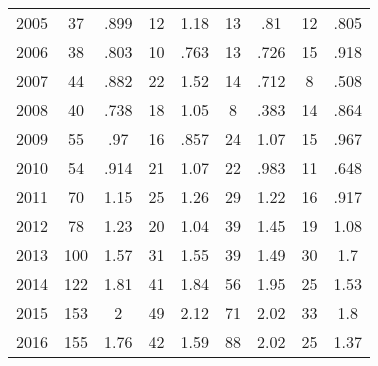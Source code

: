 \begin{table}[htbp]
\begin{tabular}{l*{8}{c}}
2005      &       37&     .899&       12&     1.18&       13&      .81&       12&     .805\\
2006      &       38&     .803&       10&     .763&       13&     .726&       15&     .918\\
2007      &       44&     .882&       22&     1.52&       14&     .712&        8&     .508\\
2008      &       40&     .738&       18&     1.05&        8&     .383&       14&     .864\\
2009      &       55&      .97&       16&     .857&       24&     1.07&       15&     .967\\
2010      &       54&     .914&       21&     1.07&       22&     .983&       11&     .648\\
2011      &       70&     1.15&       25&     1.26&       29&     1.22&       16&     .917\\
2012      &       78&     1.23&       20&     1.04&       39&     1.45&       19&     1.08\\
2013      &      100&     1.57&       31&     1.55&       39&     1.49&       30&      1.7\\
2014      &      122&     1.81&       41&     1.84&       56&     1.95&       25&     1.53\\
2015      &      153&        2&       49&     2.12&       71&     2.02&       33&      1.8\\
2016      &      155&     1.76&       42&     1.59&       88&     2.02&       25&     1.37\\
\hline\hline
\end{tabular}
\end{table}
